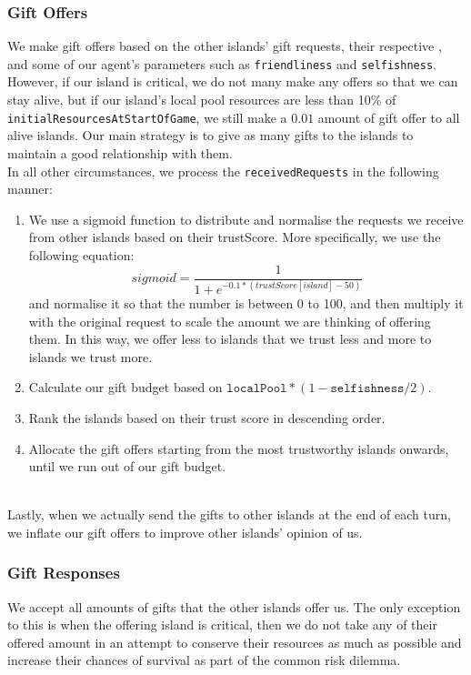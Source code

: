 \documentclass{article}
\begin{document}
\subsubsection{Gift Offers}
We make gift offers based on the other islands' gift requests, their respective , and some of our agent's parameters such as \texttt{friendliness} and \texttt{selfishness}. However, if our island is critical, we do not many make any offers so that we can stay alive, but if our island's local pool resources are less than 10\% of \texttt{initialResourcesAtStartOfGame}, we still make a $0.01$ amount of gift offer to all alive islands. Our main strategy is to give as many gifts to the islands to maintain a good relationship with them.\\

In all other circumstances, we process the \texttt{receivedRequests} in the following manner:

\begin{enumerate}
    \item We use a sigmoid function to distribute and normalise the requests we receive from other islands based on their trustScore. More specifically, we use the following equation:
    \begin{equation}
    sigmoid = \frac{1}{1+e^{-0.1*(trustScore[island]-50)}}
    \end{equation}
    and normalise it so that the number is between 0 to 100, and then multiply it with the original request to scale the amount we are thinking of offering them. In this way, we offer less to islands that we trust less and more to islands we trust more.
    \item Calculate our gift budget based on \(\texttt{localPool}*(1-\texttt{selfishness}/2)\).
    \item Rank the islands based on their trust score in descending order.
    \item Allocate the gift offers starting from the most trustworthy islands onwards, until we run out of our gift budget.
\end{enumerate}
\\
Lastly, when we actually send the gifts to other islands at the end of each turn, we inflate our gift offers to improve other islands' opinion of us.

\subsubsection{Gift Responses}
We accept all amounts of gifts that the other islands offer us. The only exception to this is when the offering island is critical, then we do not take any of their offered amount in an attempt to conserve their resources as much as possible and increase their chances of survival as part of the common risk dilemma.
\end{document}
